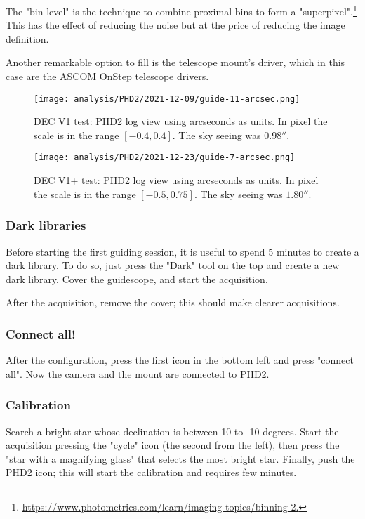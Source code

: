 The "bin level" is the technique to combine proximal bins to form a "superpixel".\footnote{\url{https://www.photometrics.com/learn/imaging-topics/binning-2.}}
This has the effect of reducing the noise but at the price of reducing the image definition.

Another remarkable option to fill is the telescope mount's driver, which in this case are the ASCOM OnStep telescope drivers.

\begin{figure*}[t]
    \centering
    \texttt{[image: analysis/PHD2/2021-12-09/guide-11-arcsec.png]}
    \caption{DEC V1 test: PHD2 log view using arcseconds as units. In pixel the scale is in the range \([-0.4,0.4]\). The sky seeing was \(0.98''\).}
    \label{fig:guide-11-arcsec}
\end{figure*}
\begin{figure*}[t]
    \centering
    \texttt{[image: analysis/PHD2/2021-12-23/guide-7-arcsec.png]}
    \caption{DEC V1+ test: PHD2 log view using arcseconds as units. In pixel the scale is in the range \([-0.5, 0.75]\). The sky seeing was \(1.80''\).}
    \label{fig:guide-7-arcseconds}
\end{figure*}

\subsubsection{Dark libraries}
Before starting the first guiding session, it is useful to spend 5 minutes to create a dark library.
To do so, just press the "Dark" tool on the top and create a new dark library.
Cover the guidescope, and start the acquisition.

After the acquisition, remove the cover;
this should make clearer acquisitions.

\subsubsection{Connect all!}
After the configuration, press the first icon in the bottom left and press "connect all".
Now the camera and the mount are connected to PHD2.

\subsubsection{Calibration}
Search a bright star whose declination is between 10 to -10 degrees.
Start the acquisition pressing the "cycle" icon (the second from the left), then press the "star with a magnifying glass" that selects the most bright star.
Finally, push the PHD2 icon; this will start the calibration and requires few minutes.

